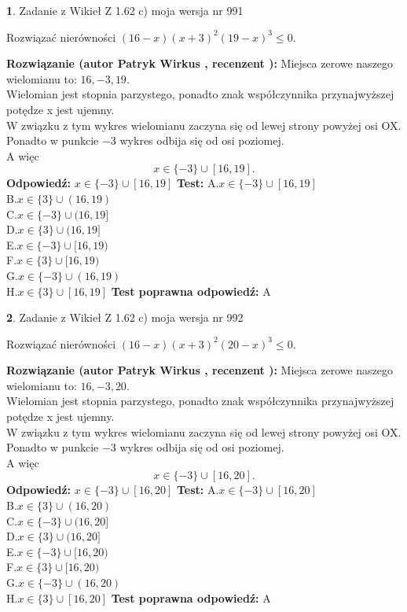 \documentclass[12pt, a4paper]{article}
\theoremstyle{definition} %
\newtheorem{zad}{}
\newcommand{\zadStart}[1]{\begin{zad}#1\newline}
\newcommand{\zadStop}{\end{zad}}
\newcommand{\rozwStart}[2]{\noindent \textbf{Rozwiązanie (autor #1 , recenzent #2): }\newline}
\newcommand{\rozwStop}{\newline}
\newcommand{\odpStart}{\noindent \textbf{Odpowiedź:}\newline}
\newcommand{\odpStop}{\newline}
\newcommand{\testStart}{\noindent \textbf{Test:}\newline}
\newcommand{\testStop}{\newline}
\newcommand{\kluczStart}{\noindent \textbf{Test poprawna odpowiedź:}\newline}
\newcommand{\kluczStop}{\newline}
\begin{document}
\zadStart{Zadanie z Wikieł Z 1.62 c) moja wersja nr 991}

Rozwiązać nierówności $(16-x)(x+3)^{2}(19-x)^{3}\le0$.
\zadStop
\rozwStart{Patryk Wirkus}{}
Miejsca zerowe naszego wielomianu to: $16, -3, 19$.\\
Wielomian jest stopnia parzystego, ponadto znak współczynnika przy\linebreak najwyższej potędze x jest ujemny.\\ W związku z tym wykres wielomianu zaczyna się od lewej strony powyżej osi OX.\\
Ponadto w punkcie $-3$ wykres odbija się od osi poziomej.\\
A więc $$x \in \{-3\} \cup [16,19].$$
\rozwStop
\odpStart
$x \in \{-3\} \cup [16,19]$
\odpStop
\testStart
A.$x \in \{-3\} \cup [16,19]$\\
B.$x \in \{3\} \cup (16,19)$\\
C.$x \in \{-3\} \cup (16,19]$\\
D.$x \in \{3\} \cup (16,19]$\\
E.$x \in \{-3\} \cup [16,19)$\\
F.$x \in \{3\} \cup [16,19)$\\
G.$x \in \{-3\} \cup (16,19)$\\
H.$x \in \{3\} \cup [16,19]$
\testStop
\kluczStart
A
\kluczStop



\zadStart{Zadanie z Wikieł Z 1.62 c) moja wersja nr 992}

Rozwiązać nierówności $(16-x)(x+3)^{2}(20-x)^{3}\le0$.
\zadStop
\rozwStart{Patryk Wirkus}{}
Miejsca zerowe naszego wielomianu to: $16, -3, 20$.\\
Wielomian jest stopnia parzystego, ponadto znak współczynnika przy\linebreak najwyższej potędze x jest ujemny.\\ W związku z tym wykres wielomianu zaczyna się od lewej strony powyżej osi OX.\\
Ponadto w punkcie $-3$ wykres odbija się od osi poziomej.\\
A więc $$x \in \{-3\} \cup [16,20].$$
\rozwStop
\odpStart
$x \in \{-3\} \cup [16,20]$
\odpStop
\testStart
A.$x \in \{-3\} \cup [16,20]$\\
B.$x \in \{3\} \cup (16,20)$\\
C.$x \in \{-3\} \cup (16,20]$\\
D.$x \in \{3\} \cup (16,20]$\\
E.$x \in \{-3\} \cup [16,20)$\\
F.$x \in \{3\} \cup [16,20)$\\
G.$x \in \{-3\} \cup (16,20)$\\
H.$x \in \{3\} \cup [16,20]$
\testStop
\kluczStart
A
\kluczStop
\end{document}
